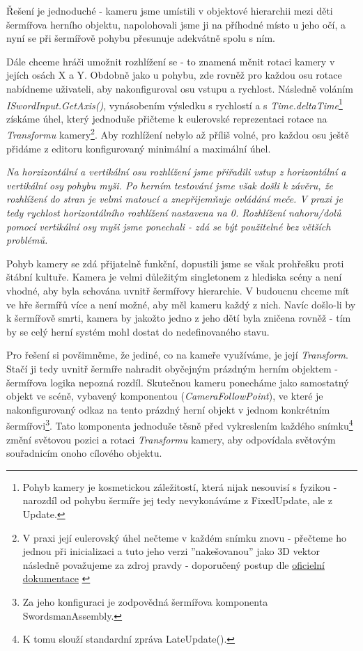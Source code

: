 Řešení je jednoduché - kameru jsme umístili v objektové hierarchii mezi děti šermířova herního objektu, napolohovali jsme ji na příhodné místo u jeho očí, a nyní se při šermířově pohybu přesunuje adekvátně spolu s ním. 

Dále chceme hráči umožnit rozhlížení se - to znamená měnit rotaci kamery v jejích osách X a Y. Obdobně jako u pohybu, zde rovněž pro každou osu rotace nabídneme uživateli, aby nakonfiguroval osu vstupu a rychlost. Následně voláním\textit{ ISwordInput.GetAxis()}, vynásobením výsledku s rychlostí a s \textit{Time.deltaTime}\footnote{Pohyb kamery je kosmetickou záležitostí, která nijak nesouvisí s fyzikou - narozdíl od pohybu šermíře jej tedy nevykonáváme z FixedUpdate, ale z Update.} získáme úhel, který jednoduše přičteme k eulerovské reprezentaci rotace na \textit{Transformu} kamery\footnote{V praxi její eulerovský úhel nečteme v každém snímku znovu - přečteme ho jednou při inicializaci a tuto jeho verzi ''nakešovanou'' jako 3D vektor následně považujeme za zdroj pravdy - doporučený postup dle \href{https://docs.unity3d.com/2022.2/Documentation/ScriptReference/Quaternion-eulerAngles.html}{\underline{oficielní dokumentace}} \cite{Unity}}. Aby rozhlížení nebylo až příliš volné, pro každou osu ještě přidáme z editoru konfigurovaný minimální a maximální úhel.

\textit{Na horzizontální a vertikální osu rozhlížení jsme přiřadili vstup z horizontální a vertikální osy pohybu myši. Po herním testování jsme však došli k závěru, že rozhlížení do stran je velmi matoucí a znepřijemňuje ovládání meče. V praxi je tedy rychlost horizontálního rozhlížení nastavena na 0. Rozhlížení nahoru/dolů pomocí vertikální osy myši jsme ponechali - zdá se být použitelné bez větších problémů.}

Pohyb kamery se zdá přijatelně funkční, dopustili jsme se však prohřešku proti štábní kultuře. Kamera je velmi důležitým singletonem z hlediska scény a není vhodné, aby byla schována uvnitř šermířovy hierarchie. V budoucnu chceme mít ve hře šermířů více a není možné, aby měl kameru každý z nich. Navíc došlo-li by k šermířově smrti, kamera by jakožto jedno z jeho dětí byla zničena rovněž - tím by se celý herní systém mohl dostat do nedefinovaného stavu.

Pro řešení si povšimněme, že jediné, co na kameře využíváme, je její \textit{Transform}. Stačí ji tedy uvnitř šermíře nahradit obyčejným prázdným herním objektem - šermířova logika nepozná rozdíl. Skutečnou kameru ponecháme jako samostatný objekt ve scéně, vybavený komponentou (\textit{CameraFollowPoint}), ve které je nakonfigurovaný odkaz na tento prázdný herní objekt v jednom konkrétním šermířovi\footnote{Za jeho konfiguraci je zodpovědná šermířova komponenta SwordsmanAssembly.}. Tato komponenta jednoduše těsně před vykreslením každého snímku\footnote{K tomu slouží standardní zpráva LateUpdate().} změní světovou pozici a rotaci \textit{Transformu} kamery, aby odpovídala světovým souřadnicím onoho cílového objektu. 


